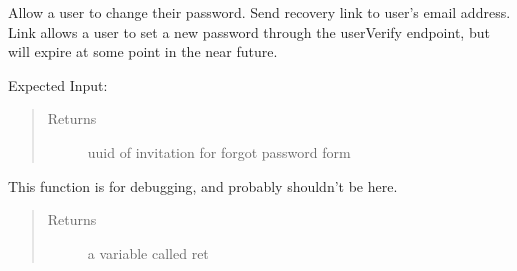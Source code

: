 \documentclass[letterpaper,10pt,english]{sphinxmanual}
\begin{document}
\begin{fulllineitems}
\begin{fulllineitems}
\label{\detokenize{apidoc/utdesign_procurement:utdesign_procurement.apigateway.ApiGateway.userForgotPassword}}
Allow a user to change their password. Send recovery link to user’s
email address. Link allows a user to set a new password through the
userVerify endpoint, but will expire at some point in the near future.

Expected Input:

\begin{sphinxVerbatim}[commandchars=\\\{\}]
     
\end{sphinxVerbatim}
\begin{quote}\begin{description}
\item[{Returns}] \leavevmode
uuid of invitation for forgot password form

\end{description}\end{quote}

\end{fulllineitems}


\begin{fulllineitems}
\label{\detokenize{apidoc/utdesign_procurement:utdesign_procurement.apigateway.ApiGateway.userInfo}}
This function is for debugging, and probably shouldn’t be here.
\begin{quote}\begin{description}
\item[{Returns}] \leavevmode
a variable called ret

\end{description}\end{quote}

\end{fulllineitems}



\end{fulllineitems}
\end{document}
